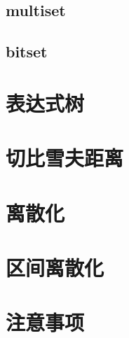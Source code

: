 \documentclass{probook}
\begin{document}
\subsection{multiset}

\subsection{bitset}

\section{表达式树} 
 
\section{切比雪夫距离} 
 
\section{离散化} 

\section{区间离散化} 

\section{注意事项}


\end{document}
